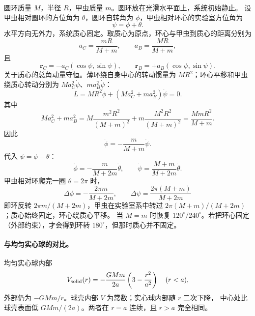 \documentclass[UTF8,a4paper,11pt]{ctexart}
\begin{document}
圆环质量 $M$，半径 $R$，甲虫质量 $m$。圆环放在光滑水平面上，系统初始静止。
设甲虫相对圆环的方位角为 $\theta$，圆环自转角为 $\phi$，甲虫相对环心的实验室方位角为
\begin{equation}
  \psi=\phi+\theta.
\end{equation}
水平方向无外力，系统质心固定。取质心为原点，环心与甲虫到质心的距离分别为
\begin{equation}
  a_C=\frac{mR}{M+m},\qquad a_B=\frac{MR}{M+m},
\end{equation}
且
\begin{equation}
  \mathbf r_C=-a_C(\cos\psi,\sin\psi),\qquad
  \mathbf r_B=+a_B(\cos\psi,\sin\psi).
\end{equation}
关于质心的总角动量守恒。薄环绕自身中心的转动惯量为 $MR^2$；环心平移和甲虫绕质心转动分别为
$M a_C^2\dot\psi$、$m a_B^2\dot\psi$：
\begin{equation}
  L=MR^2\dot\phi+\left(Ma_C^2+ma_B^2\right)\dot\psi=0.
\end{equation}
其中
\begin{equation}
  Ma_C^2+ma_B^2
  =M\frac{m^2R^2}{(M+m)^2}+m\frac{M^2R^2}{(M+m)^2}
  =\frac{MmR^2}{M+m}.
\end{equation}
因此
\begin{equation}
  \dot\phi=-\frac{m}{M+m}\dot\psi.
\end{equation}
代入 $\psi=\phi+\theta$：
\begin{equation}
  \dot\phi=-\frac{m}{M+2m}\dot\theta,\qquad
  \dot\psi=\frac{M+m}{M+2m}\dot\theta.
\end{equation}
甲虫相对环爬完一圈 $\theta=2\pi$ 时，
\begin{equation}
  \boxed{\;\Delta\phi=-\frac{2\pi m}{M+2m},\qquad
  \Delta\psi=\frac{2\pi(M+m)}{M+2m}\;}
\end{equation}
即环反转 $2\pi m/(M+2m)$，甲虫在实验室系中转过 $2\pi(M+m)/(M+2m)$；质心始终固定，环心绕质心平移。
当 $M=m$ 时恢复 $120^\circ/240^\circ$。若把环心固定（外部约束），才会得到环转 $180^\circ$，但那时质心并不固定。

\paragraph{与均匀实心球的对比。}
均匀实心球内部
\begin{equation}
  V_{\rm solid}(r)=-\frac{GMm}{2a}\left(3-\frac{r^2}{a^2}\right)\quad(r<a),
\end{equation}
外部仍为 $-GMm/r$。球壳内部 $V$ 为常数；实心球内部随 $r$ 二次下降，
中心处比球壳表面低 $GMm/(2a)$。两者在 $r=a$ 连续，且 $r>a$ 完全相同。
\end{document}

